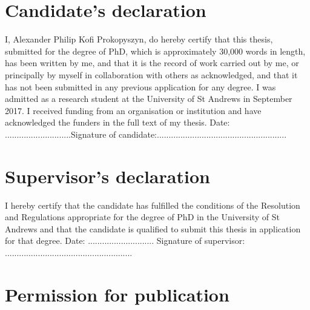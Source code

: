 \documentclass[12pt,fleqn]{report}
\numberwithin{equation}{section}
\begin{document}
\onehalfspacing

% 



\newpage

\section*{Candidate’s declaration}

I, Alexander Philip Kofi Prokopyszyn, do hereby certify that this thesis, submitted for the
degree of PhD, which is approximately 30,000 words in length, has been written by
me, and that it is the record of work carried out by me, or principally by myself in
collaboration with others as acknowledged, and that it has not been submitted in any
previous application for any degree.
\vskip 0.2in
\noindent I was admitted as a research student at the University of St Andrews in September 2017.
\vskip 0.2in
\noindent I received funding from an organisation or institution and have acknowledged the funders in the full text of my thesis.
\vskip 0.2in
\noindent Date: ............................\quad Signature of candidate:.......................................................
\vskip 1in

\section*{Supervisor’s declaration}

I hereby certify that the candidate has fulfilled the conditions of the Resolution and
Regulations appropriate for the degree of PhD in the University of St Andrews and
that the candidate is qualified to submit this thesis in application for that degree.
\vskip 0.2in
\noindent Date: ............................ \quad Signature of supervisor: ......................................................

\newpage

\section*{Permission for publication}
\end{document}
